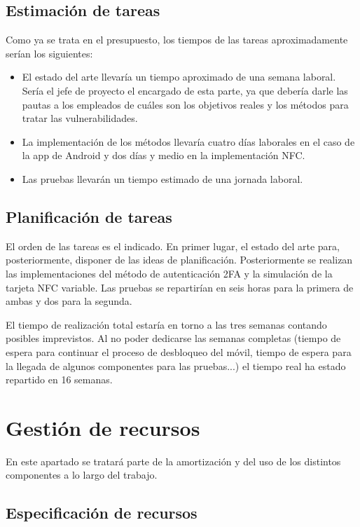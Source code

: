 \documentclass[12pt,a4paper,onecolumn,oneside]{report}
\begin{document}
\subsection{Estimación de tareas}

Como ya se trata en el presupuesto, los tiempos de las tareas aproximadamente serían los siguientes:
\begin{itemize}
\item El estado del arte llevaría un tiempo aproximado de una semana laboral. Sería el jefe de proyecto el encargado de esta parte, ya que debería darle las pautas a los empleados de cuáles son los objetivos reales y los métodos para tratar las vulnerabilidades. 
\item La implementación de los métodos llevaría cuatro días laborales en el caso de la app de Android y dos días y medio en la implementación NFC.
\item Las pruebas llevarán un tiempo estimado de una jornada laboral.
\end{itemize}


\subsection{Planificación de tareas}

El orden de las tareas es el indicado. En primer lugar, el estado del arte para, posteriormente, disponer de las ideas de planificación. Posteriormente se realizan las implementaciones del método de autenticación 2FA y la simulación de la tarjeta NFC variable. Las pruebas se repartirían en seis horas para la primera de ambas y dos para la segunda.

El tiempo de realización total estaría en torno a las tres semanas contando posibles imprevistos. Al no poder dedicarse las semanas completas (tiempo de espera para continuar el proceso de desbloqueo del móvil, tiempo de espera para la llegada de algunos componentes para las pruebas...) el tiempo real ha estado repartido en 16 semanas.


\section{Gestión de recursos}

En este apartado se tratará parte de la amortización y del uso de los distintos componentes a lo largo del trabajo.

\subsection{Especificación de recursos}
\end{document}
